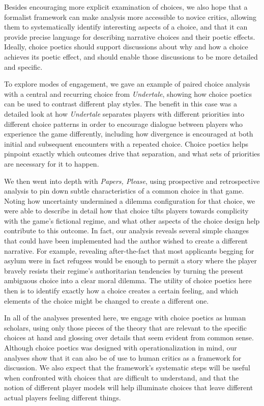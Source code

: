 \documentclass[arts,article,submit,moreauthors,pdftex,10pt,a4paper]{Definitions/mdpi}
\begin{document}
Besides encouraging more explicit examination of choices, we also hope that a formalist framework can make analysis more accessible to novice critics, allowing them to systematically identify interesting aspects of a choice, and that it can provide precise language for describing narrative choices and their poetic effects.
%
Ideally, choice poetics should support discussions about why and how a choice achieves its poetic effect, and should enable those discussions to be more detailed and specific.


To explore modes of engagement, we gave an example of paired choice analysis with a central and recurring choice from \emph{Undertale}, showing how choice poetics can be used to contrast different play styles.
%
The benefit in this case was a detailed look at how \emph{Undertale} separates players with different priorities into different choice patterns in order to encourage dialogue between players who experience the game differently, including how divergence is encouraged at both initial and subsequent encounters with a repeated choice.
%
Choice poetics helps pinpoint exactly which outcomes drive that separation, and what sets of priorities are necessary for it to happen.


We then went into depth with \emph{Papers, Please}, using prospective and retrospective analysis to pin down subtle characteristics of a common choice in that game.
%
Noting how uncertainty undermined a dilemma configuration for that choice, we were able to describe in detail how that choice tilts players towards complicity with the game's fictional regime, and what other aspects of the choice design help contribute to this outcome.
%
In fact, our analysis reveals several simple changes that could have been implemented had the author wished to create a different narrative.
%
For example, revealing after-the-fact that most applicants begging for asylum were in fact refugees would be enough to permit a story where the player bravely resists their regime's authoritarian tendencies by turning the present ambiguous choice into a clear moral dilemma.
%
The utility of choice poetics here then is to identify exactly how a choice creates a certain feeling, and which elements of the choice might be changed to create a different one.


In all of the analyses presented here, we engage with choice poetics as human scholars, using only those pieces of the theory that are relevant to the specific choices at hand and glossing over details that seem evident from common sense.
%
Although choice poetics was designed with operationalization in mind, our analyses show that it can also be of use to human critics as a framework for discussion.
%
We also expect that the framework's systematic steps will be useful when confronted with choices that are difficult to understand, and that the notion of different player models will help illuminate choices that leave different actual players feeling different things.
\end{document}
